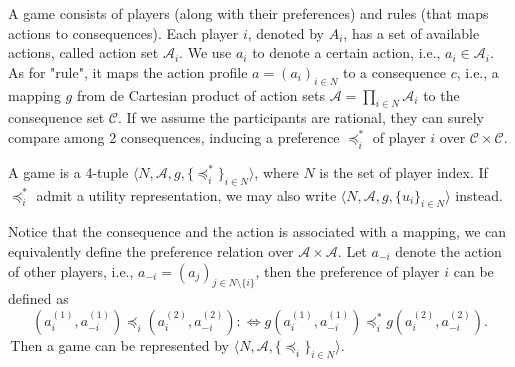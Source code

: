 A game consists of players (along with their preferences) and rules (that maps actions to consequences). Each player $i$, denoted by $A_i$, has a set of available actions, called action set $\mathcal{A}_i$. 
We use $a_i$ to denote a certain action, i.e., $a_i\in \mathcal{A}_i$. As for "rule", it maps the action profile $a = (a_i)_{i\in N}$ to a consequence $c$, i.e., a mapping $g$ from de Cartesian product of action sets $\mathcal{A} = \prod_{i\in N} \mathcal{A}_i$ to the consequence set $\mathcal{C}$.
If we assume the participants are rational, they can surely compare among 2 consequences, inducing a preference $\preceq^*_i$ of player $i$ over $\mathcal{C} \times \mathcal{C}$.

\begin{definition}[Game]
    A game is a 4-tuple $\langle N,\mathcal{A}, g, \{\preceq_i^*\}_{i\in N}  \rangle $, where $N$ is the set of player index. If $\preceq_i^*$ admit a utility representation, 
    we may also write $\langle N,\mathcal{A}, g, \{u_i\}_{i\in N}  \rangle $ instead.
\end{definition}

Notice that the consequence and the action is associated with a mapping, we can equivalently define the preference relation over $\mathcal{A}\times \mathcal{A}$. Let $a_{-i}$ denote the action of other players, i.e., $a_{-i} = (a_j)_{j\in N \setminus \{i\}}$, then
the preference of player $i$ can be defined as $$(a^{(1)}_i,a^{(1)}_{-i}) \preceq_i (a^{(2)}_i,a^{(2)}_{-i}) :\iff g(a^{(1)}_i,a^{(1)}_{-i}) \preceq_i^* g(a^{(2)}_i,a^{(2)}_{-i}).$$
\,Then a game can be represented by $\langle N,\mathcal{A}, \{\preceq_i\}_{i\in N}  \rangle$.


